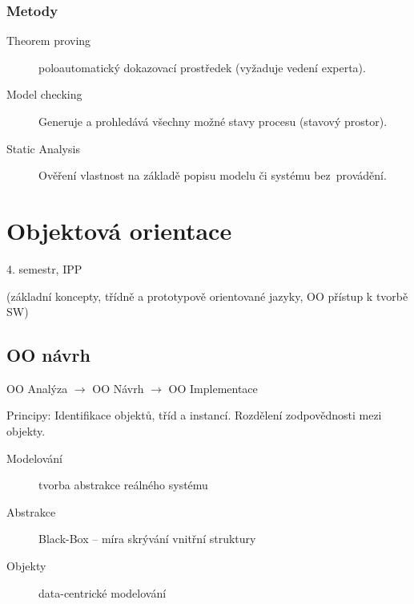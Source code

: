 \documentclass[a4paper, 11pt]{report}
\begin{document}
\subsection{Metody}
\begin{description}
	\item[Theorem proving] poloautomatický dokazovací prostředek (vyžaduje vedení experta).
	\item[Model checking] Generuje a prohledává všechny možné stavy procesu (stavový prostor).
	\item[Static Analysis] Ověření vlastnost na základě popisu modelu či systému bez~provádění.
\end{description}





































\setcounter{chapter}{35}
\chapter{Objektová orientace} \label{cha:36}

4. semestr, IPP

(základní koncepty, třídně a prototypově orientované jazyky, OO přístup k tvorbě SW)

\section{OO návrh}

OO Analýza $ \to $ OO Návrh $ \to $ OO Implementace

Principy: Identifikace objektů, tříd a instancí. Rozdělení zodpovědnosti mezi objekty.

\begin{description}
	\item[Modelování] tvorba abstrakce reálného systému
	\item[Abstrakce] Black-Box -- míra skrývání vnitřní struktury
	\item[Objekty] data-centrické modelování
\end{description}
\end{document}
